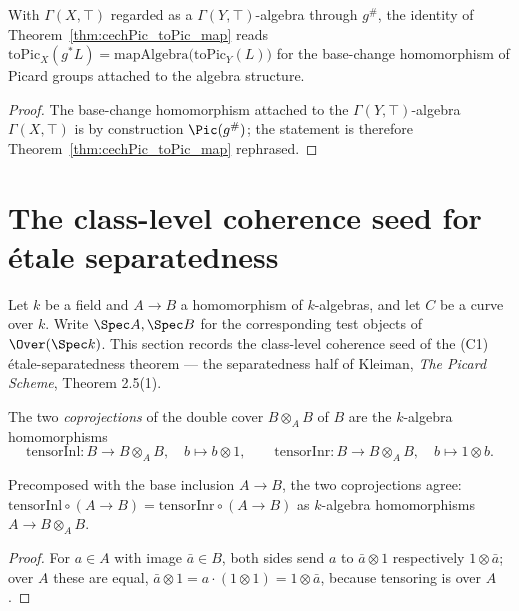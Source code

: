 \begin{theorem}
  \label{thm:cechPic_toPic_mapAlgebra}
  \leanok
  With \(\Gamma(X, \top)\) regarded as a \(\Gamma(Y, \top)\)-algebra through \(g^{\#}\), the
  identity of Theorem~\ref{thm:cechPic_toPic_map} reads \(\mathrm{toPic}_X(g^{*} L) =
  \mathrm{mapAlgebra}\bigl(\mathrm{toPic}_Y(L)\bigr)\) for the base-change homomorphism of
  Picard groups attached to the algebra structure.
\end{theorem}
\begin{proof}
  \leanok
  The base-change homomorphism attached to the \(\Gamma(Y, \top)\)-algebra \(\Gamma(X, \top)\)
  is by construction \(\Pic(g^{\#})\); the statement is therefore
  Theorem~\ref{thm:cechPic_toPic_map} rephrased.
\end{proof}

\section{The class-level coherence seed for \'etale separatedness}
\label{sec:etaleSeparatedness}

Let \(k\) be a field and \(A \to B\) a homomorphism of \(k\)-algebras, and let \(C\) be a curve
over \(k\).  Write \(\Spec A, \Spec B\) for the corresponding test objects of \(\Over(\Spec
k)\).  This section records the class-level coherence seed of the (C1) \'etale-separatedness
theorem — the separatedness half of Kleiman, \emph{The Picard Scheme}, Theorem 2.5(1).

\begin{definition}
  \label{def:tensorInl_tensorInr}
  \leanok
  The two \emph{coprojections} of the double cover \(B \otimes_A B\) of \(B\) are the
  \(k\)-algebra homomorphisms
  \[
    \mathrm{tensorInl} \colon B \to B \otimes_A B, \quad b \mapsto b \otimes 1, \qquad
    \mathrm{tensorInr} \colon B \to B \otimes_A B, \quad b \mapsto 1 \otimes b.
  \]
\end{definition}

\begin{lemma}
  \label{lem:tensorInl_comp_ofId}
  \leanok
  Precomposed with the base inclusion \(A \to B\), the two coprojections agree:
  \(\mathrm{tensorInl} \circ (A \to B) = \mathrm{tensorInr} \circ (A \to B)\) as \(k\)-algebra
  homomorphisms \(A \to B \otimes_A B\).
\end{lemma}
\begin{proof}
  \leanok
  For \(a \in A\) with image \(\bar a \in B\), both sides send \(a\) to \(\bar a \otimes 1\)
  respectively \(1 \otimes \bar a\); over \(A\) these are equal, \(\bar a \otimes 1 = a \cdot (1
  \otimes 1) = 1 \otimes \bar a\), because tensoring is over \(A\).
\end{proof}


